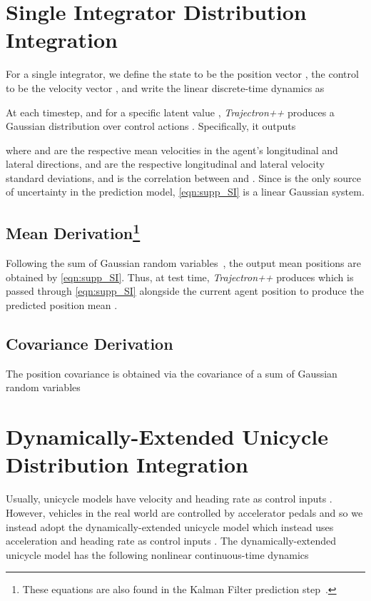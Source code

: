 \documentclass[runningheads]{llncs}
\newcommand{\algname}{\mbox{Trajectron++}}
\newcommand{\emphalgname}{\emph{\algname}}
\begin{document}
\nocite{HigginsMattheyEtAl2017,BowmanVilnisEtAl2015,HallacLeskovecEtAl2015,LaValle2006Unicycle,SchollerAravantinosEtAl2020}






\appendix

\section{Single Integrator Distribution Integration} \label{sec:si_integration}
For a single integrator, we define the state to be the position vector , the control to be the velocity vector , and write the linear discrete-time dynamics as

At each timestep, and for a specific latent value , \emphalgname{} produces a Gaussian distribution over control actions . Specifically, it outputs

where  and  are the respective mean velocities in the agent's longitudinal and lateral directions,  and  are the respective longitudinal and lateral velocity standard deviations, and  is the correlation between  and . Since  is the only source of uncertainty in the prediction model, \cref{eqn:supp_SI} is a linear Gaussian system.

\subsection{Mean Derivation\protect\footnote{These equations are also found in the Kalman Filter prediction step~\cite{Kalman1960}.}}
Following the sum of Gaussian random variables~\cite{Kalman1960}, the output mean positions are obtained by \cref{eqn:supp_SI}. Thus, at test time, \emphalgname{} produces  which is passed through \cref{eqn:supp_SI} alongside the current agent position  to produce the predicted position mean .


\subsection{Covariance Derivation\protect\footnotemark[2]}
The position covariance is obtained via the covariance of a sum of Gaussian random variables~\cite{Kalman1960}


\section{Dynamically-Extended Unicycle Distribution Integration}\label{sec:unicycle_integration}
Usually, unicycle models have velocity and heading rate as control inputs \cite{LaValle2006Unicycle,PadenCapEtAl2016}. However, vehicles in the real world are controlled by accelerator pedals and so we instead adopt the dynamically-extended unicycle model which instead uses acceleration  and heading rate  as control inputs \cite{LaValle2006BetterUnicycle}. The dynamically-extended unicycle model has the following nonlinear continuous-time dynamics
\end{document}
